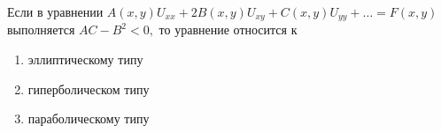 Если в уравнении \(A\left(x,y\right)U_{xx}+2B\left(x,y\right)U_{xy}+C\left(x,y\right)U_{yy}+\dots =F\left(x,y\right)\) выполняется \(AC-B^2<0,\) то уравнение относится к

\begin{enumerate}[label=\arabic*)]
    \item эллиптическому типу
    \item гиперболическом типу
    \item параболическому типу
\end{enumerate}

